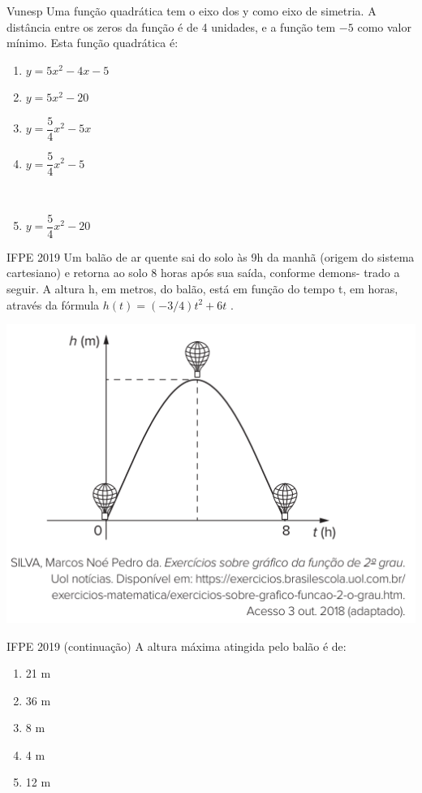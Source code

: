 \documentclass[11pt]{beamer}
\newif\ifgab
\newcommand{\gab}[1]{%
  \ifgab
    \textcolor{red!80!black}{\textbf{#1}}%
  \else
    #1%
  \fi
}
\begin{document}
\begin{frame}{Vunesp}
    Uma função quadrática tem o eixo dos y como eixo de simetria. A distância entre os zeros da função é de 4 unidades, e a função tem $-5$ como valor mínimo. Esta função quadrática é:

    \begin{enumerate}[a]
        \item $y=5x^{2}-4x-5$
        \item $y=5x^{2}-20$ \\
        \item $y=\dfrac{5}{4}x^{2}-5x$ \\
        \item \gab{$y=\dfrac{5}{4}x^{2}-5$} \\ %
        \item $y=\dfrac{5}{4}x^{2}-20$
    \end{enumerate}
\end{frame}

\begin{frame}{IFPE 2019}
    Um balão de ar quente sai do solo às 9h da manhã (origem do sistema cartesiano) e retorna ao solo 8 horas após sua saída, conforme demons- trado a seguir. A altura h, em metros, do balão, está em função do tempo t, em horas, através da fórmula $h(t)=(-{3}/{4})t^{2}+6t$ .

    \begin{center}
        \includegraphics[scale=0.5]{imagens/IFPE 2019.png}
    \end{center}
\end{frame}

\begin{frame}{IFPE 2019 (continuação)}
    A altura máxima atingida pelo balão é de:

    \begin{enumerate}[a]
        \item \gab{21 m} %
        \item 36 m
        \item 8 m 
        \item 4 m
        \item 12 m
    \end{enumerate}
\end{frame}
\end{document}

